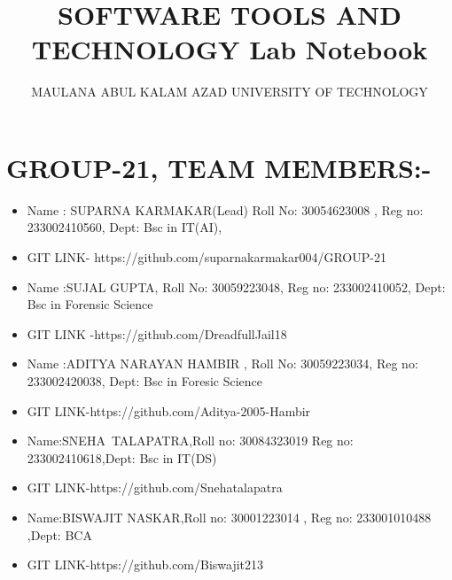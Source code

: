\documentclass{article}
\begin{document}
\title{SOFTWARE TOOLS AND TECHNOLOGY Lab Notebook}
\author{MAULANA ABUL KALAM AZAD UNIVERSITY OF TECHNOLOGY}
\date{}
\maketitle

\section*{GROUP-21, TEAM MEMBERS:-}
\begin{itemize}
    \item Name : SUPARNA KARMAKAR(Lead)
        Roll No: 30054623008 ,
       Reg no: 233002410560, 
       Dept:  Bsc in IT(AI),
       \item GIT LINK- https://github.com/suparnakarmakar004/GROUP-21
    \item Name :SUJAL GUPTA, 
        Roll No: 30059223048,
        Reg no: 233002410052,
        Dept: Bsc in Forensic Science
        \item GIT LINK -https://github.com/DreadfullJail18
    \item Name :ADITYA NARAYAN HAMBIR , 
       Roll No:  30059223034,
       Reg no: 233002420038,
       Dept: Bsc in Foresic Science
       \item GIT LINK-https://github.com/Aditya-2005-Hambir 
    \item Name:SNEHA TALAPATRA,Roll no: 30084323019
Reg no:  233002410618,Dept:   Bsc in IT(DS)
\item GIT LINK-https://github.com/Snehatalapatra
\item Name:BISWAJIT NASKAR,Roll no:  30001223014 , Reg no: 233001010488 ,Dept:  BCA
\item GIT LINK-https://github.com/Biswajit213
\end{itemize}
\end{document}
